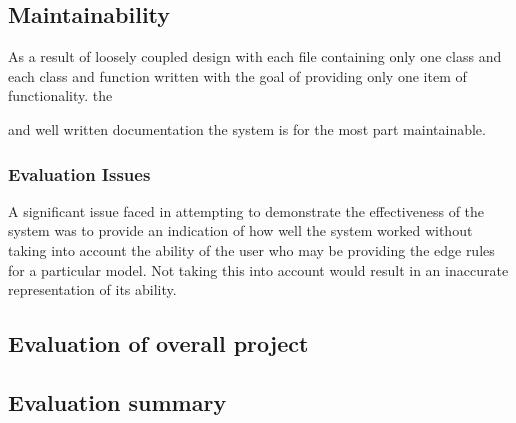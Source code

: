 \subsection{Maintainability}
As a result of loosely coupled design with each file containing only one class and each class and function written with the goal of providing only one item of functionality. the 

and well written documentation the system is for the most part maintainable. 


\subsubsection{Evaluation Issues}
A significant issue faced in attempting to demonstrate the effectiveness of the system was to provide an indication of how well the system worked without taking into account the ability of the user who may be providing the edge rules for a particular model. Not taking this into account would result in an inaccurate representation of its ability.

\subsection{Evaluation of overall project}

% 


\subsection{Evaluation summary}
